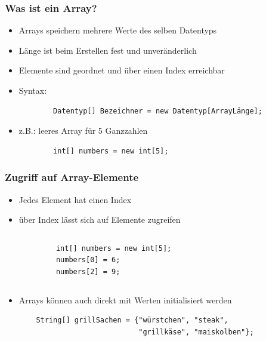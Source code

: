 \documentclass{../../presentation}
\begin{document}
\begin{frame}[fragile]
	\frametitle{Was ist ein Array?}
	\begin{itemize}
		\item\pause Arrays speichern mehrere Werte des selben Datentyps
		\item\pause Länge ist beim Erstellen fest und unveränderlich
		\item\pause Elemente sind geordnet und über einen Index erreichbar
		\item\pause Syntax:
		      \begin{verbatim}
        Datentyp[] Bezeichner = new Datentyp[ArrayLänge];
    \end{verbatim}
		\item\pause z.B.: leeres Array für 5 Ganzzahlen
		      \begin{verbatim}
		int[] numbers = new int[5];
	\end{verbatim}
	\end{itemize}
\end{frame}

\begin{frame}[fragile]
	\frametitle{Zugriff auf Array-Elemente}
	\begin{itemize}
		\item\pause Jedes Element hat einen Index
		\item\pause über Index lässt sich auf Elemente zugreifen
	\end{itemize}
	\begin{columns}
		\begin{verbatim}
            int[] numbers = new int[5];
            numbers[0] = 6;
            numbers[2] = 9;
        \end{verbatim}

		\begin{center}
		\end{center}
	\end{columns}

	\vspace{0.5cm}
	\begin{itemize}
		\item\pause Arrays können auch direkt mit Werten initialisiert werden
		      \begin{verbatim}
    String[] grillSachen = {"würstchen", "steak", 
                            "grillkäse", "maiskolben"};
    \end{verbatim}
	\end{itemize}
\end{frame}
\end{document}
